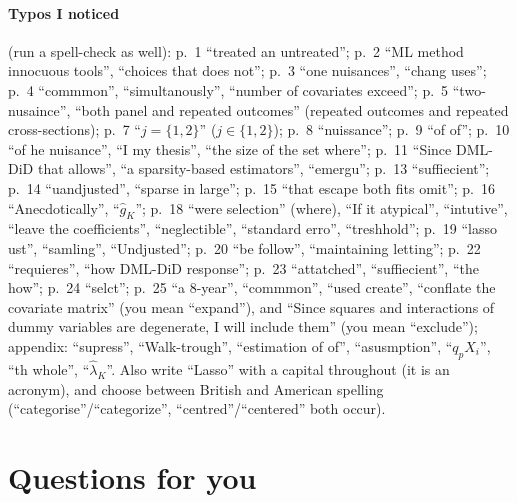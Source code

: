 \documentclass[11pt]{article}
\theoremstyle{plain}
\theoremstyle{remark}
\begin{document}
\paragraph{Typos I noticed} (run a spell-check as well):
p.~1 ``treated an untreated'';
p.~2 ``ML method innocuous tools'', ``choices that does not'';
p.~3 ``one nuisances'', ``chang uses'';
p.~4 ``commmon'', ``simultanously'', ``number of covariates exceed'';
p.~5 ``two-nusaince'', ``both panel and repeated outcomes'' (repeated outcomes
and repeated cross-sections);
p.~7 ``$j=\{1,2\}$'' ($j\in\{1,2\}$);
p.~8 ``nuissance'';
p.~9 ``of of'';
p.~10 ``of he nuisance'', ``I my thesis'', ``the size of the set where'';
p.~11 ``Since DML-DiD that allows'', ``a sparsity-based estimators'',
``emergu'';
p.~13 ``suffiecient'';
p.~14 ``uandjusted'', ``sparse in large'';
p.~15 ``that escape both fits omit'';
p.~16 ``Anecdotically'', ``$\hat g_K$'';
p.~18 ``were selection'' (where), ``If it atypical'', ``intutive'', ``leave the
coefficients'', ``neglectible'', ``standard erro'', ``treshhold'';
p.~19 ``lasso ust'', ``samling'', ``Undjusted'';
p.~20 ``be follow'', ``maintaining letting'';
p.~22 ``requieres'', ``how DML-DiD response'';
p.~23 ``attatched'', ``suffiecient'', ``the how'';
p.~24 ``selct'';
p.~25 ``a 8-year'', ``commmon'', ``used create'', ``conflate the covariate
matrix'' (you mean ``expand''), and ``Since squares and interactions of dummy
variables are degenerate, I will include them'' (you mean ``exclude'');
appendix: ``supress'', ``Walk-trough'', ``estimation of of'', ``asusmption'',
``$q_pX_i$'', ``th whole'', ``$\hat\lambda_K$''.
Also write ``Lasso'' with a capital throughout (it is an acronym), and choose
between British and American spelling (``categorise''/``categorize'',
``centred''/``centered'' both occur).

\section{Questions for you}\label{sec:questions}
\end{document}
